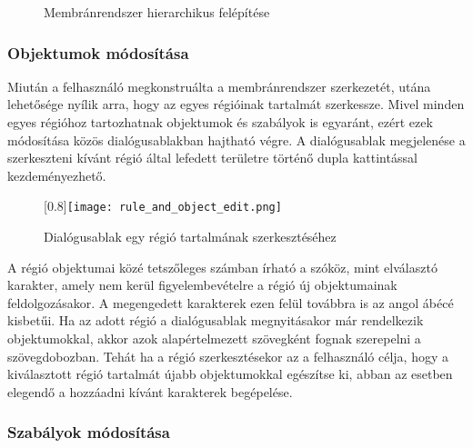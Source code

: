 \begin{figure}
\centering
{}
\caption{Membránrendszer hierarchikus felépítése\protect\footnotemark}\label{fig:structure_graph}
\end{figure}


\subsubsection{Objektumok módosítása}

Miután a felhasználó megkonstruálta a membránrendszer szerkezetét, utána lehetősége nyílik arra, hogy az egyes régióinak tartalmát szerkessze. Mivel minden egyes régióhoz tartozhatnak objektumok és szabályok is egyaránt, ezért ezek módosítása közös dialógusablakban hajtható végre. A dialógusablak megjelenése a szerkeszteni kívánt régió által lefedett területre történő dupla kattintással kezdeményezhető. 

\begin{figure}[H]
	\centering
	\scalebox{0.8}[0.8]{\texttt{[image: rule\_and\_object\_edit.png]}}
	\caption{Dialógusablak egy régió tartalmának szerkesztéséhez}
	\label{fig:obj_edit}
\end{figure}

A régió objektumai közé tetszőleges számban írható a szóköz, mint elválasztó karakter, amely nem kerül figyelembevételre a régió új objektumainak feldolgozásakor. A megengedett karakterek ezen felül továbbra is az angol ábécé kisbetűi. Ha az adott régió a dialógusablak megnyitásakor már rendelkezik objektumokkal, akkor azok alapértelmezett szövegként fognak szerepelni a szövegdobozban. Tehát ha a régió szerkesztésekor az a felhasználó célja, hogy a kiválasztott régió tartalmát újabb objektumokkal egészítse ki, abban az esetben elegendő a hozzáadni kívánt karakterek begépelése.

\subsubsection{Szabályok módosítása}

